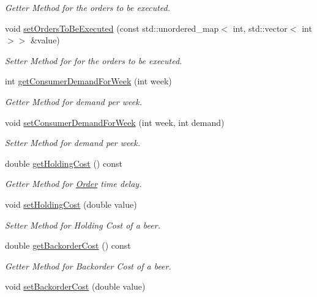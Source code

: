 \begin{DoxyCompactItemize}
\begin{DoxyCompactList}\small\item\em Getter Method for the orders to be executed. \end{DoxyCompactList}\item 
void \hyperlink{classGame_ac0bea8d7a92601d7739b1e18c8fc3379}{set\+Orders\+To\+Be\+Executed} (const std\+::unordered\+\_\+map$<$ int, std\+::vector$<$ int $>$$>$ \&value)
\begin{DoxyCompactList}\small\item\em Setter Method for for the orders to be executed. \end{DoxyCompactList}\item 
int \hyperlink{classGame_ac93de1c13e90c1f729d7dbd19b62385c}{get\+Consumer\+Demand\+For\+Week} (int week)
\begin{DoxyCompactList}\small\item\em Getter Method for demand per week. \end{DoxyCompactList}\item 
void \hyperlink{classGame_aed363630c31a7cc4674934b4af815387}{set\+Consumer\+Demand\+For\+Week} (int week, int demand)
\begin{DoxyCompactList}\small\item\em Setter Method for demand per week. \end{DoxyCompactList}\item 
double \hyperlink{classGame_a0842aaa236062f2a9dd7e9d32f0be131}{get\+Holding\+Cost} () const
\begin{DoxyCompactList}\small\item\em Getter Method for \hyperlink{classOrder}{Order} time delay. \end{DoxyCompactList}\item 
void \hyperlink{classGame_a97c662972249ca268ecc387461820c8d}{set\+Holding\+Cost} (double value)
\begin{DoxyCompactList}\small\item\em Setter Method for Holding Cost of a beer. \end{DoxyCompactList}\item 
double \hyperlink{classGame_ac00135b6b5128aca74b09e9f79d54b60}{get\+Backorder\+Cost} () const
\begin{DoxyCompactList}\small\item\em Getter Method for Backorder Cost of a beer. \end{DoxyCompactList}\item 
void \hyperlink{classGame_a41007fd1eb3df7a5f56f442267d6dff0}{set\+Backorder\+Cost} (double value)
$$
\end{DoxyCompactItemize}
